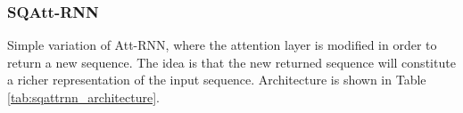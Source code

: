 \begin{table}[h!]
	\caption{Att-RNN architecture}
	\label{tab:attrnn_architecture}
\end{table}

\subsubsection{\textbf{SQAtt-RNN}}
Simple variation of Att-RNN, where the attention layer is modified in order to return a new sequence. The idea is that the new returned sequence will constitute a richer representation of the input sequence. Architecture is shown in Table \ref{tab:sqattrnn_architecture}.

\begin{table}[h!]
		\caption{SQAtt-RNN architecture}
	\label{tab:sqattrnn_architecture}
\end{table}

